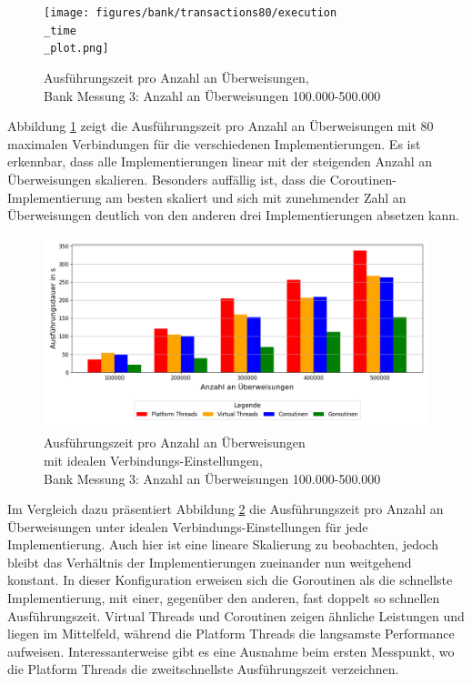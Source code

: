 \documentclass[fontsize=12pt,paper=a4,twoside=semi,parskip=half-,headsepline,headinclude]{scrreprt}
\begin{document}
\begin{figure}[H]
	\centering
	\texttt{[image: figures/bank/transactions80/execution\\\_time\\\_plot.png]}
	\caption{Ausführungszeit pro Anzahl an Überweisungen,\\ Bank Messung 3: Anzahl an Überweisungen 100.000-500.000}
	\label{fig:bankTransactions80Zeit}
\end{figure}

Abbildung \ref{fig:bankTransactions80Zeit} zeigt die Ausführungszeit pro Anzahl an Über\-wei\-sung\-en mit 80 maximalen Verbindungen für die verschiedenen Implementierungen. Es ist erkennbar, dass alle Implementierungen linear mit der steigenden Anzahl an Überweisungen skalieren. Besonders auffällig ist, dass die Coroutinen-Implementierung am besten skaliert und sich mit zunehmender Zahl an Überweisungen deutlich von den anderen drei Implementierungen absetzen kann.

\begin{figure}[H]
	\centering
	\includegraphics[scale=0.49]{figures/bank/transactionsIdeal/execution_time_plot.png}
	\caption{Ausführungszeit pro Anzahl an Überweisungen \\mit idealen Verbindungs-Einstellungen,\\ Bank Messung 3: Anzahl an Überweisungen 100.000-500.000}
	\label{fig:bankTransactionsIdealZeit}
\end{figure}

Im Vergleich dazu präsentiert Abbildung \ref{fig:bankTransactionsIdealZeit} die Ausführungszeit pro Anzahl an Über\-wei\-sun\-gen unter idealen Verbindungs-Einstellungen für jede Implementierung. Auch hier ist eine lineare Skalierung zu beobachten, jedoch bleibt das Verhältnis der Implementierungen zueinander nun weitgehend konstant. In dieser Konfiguration erweisen sich die Goroutinen als die schnellste Implementierung, mit einer, gegenüber den anderen, fast doppelt so schnellen Ausführungszeit. Virtual Threads und Coroutinen zeigen ähnliche Leistungen und liegen im Mittelfeld, während die Platform Threads die langsamste Performance aufweisen. Interessanterweise gibt es eine Ausnahme beim ersten Messpunkt, wo die Platform Threads die zweitschnellste Ausführungszeit verzeichnen.
\end{document}

